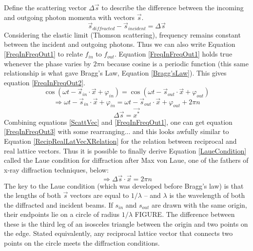 Define the scattering vector $\Delta\vec{s}$ to describe the difference between the incoming and outgoing photon momenta with vectors $\vec{s}$.
\begin{equation}
    \vec{s}_{diffracted}-\vec{s}_{incident}=\Delta\vec{s}
    \label{ScattVec}
\end{equation}
Considering the elastic limit (Thomson scattering), frequency remains constant between the incident and outgoing photons. Thus we can also write Equation \ref{FreqInFreqOut1} to relate $f_{in}$ to $f_{out}$. Equation \ref{FreqInFreqOut1} holds true whenever the phase varies by $2\pi n$ because cosine is a periodic function (this same relationship is what gave Bragg’s Law, Equation \ref{Bragg'sLaw}). This gives equation \ref{FreqInFreqOut2}. 
\begin{equation}
   \cos{(\omega t-\vec{s}_{in}\cdot\vec{x}+\varphi_{in})}=\cos{(\omega t-\vec{s}_{out}\cdot\vec{x}+\varphi_{out})}
    \label{FreqInFreqOut1}
\end{equation}
\begin{equation}
    \Rightarrow\omega t-\vec{s}_{in}\cdot\vec{x}+\varphi_{in}=\omega t-\vec{s}_{out}\cdot\vec{x}+\varphi_{out}+2\pi n
    \label{FreqInFreqOut2}
\end{equation}
\begin{equation}
    \Delta\vec{s}=\vec{x^*}
    \label{FreqInFreqOut3}
\end{equation}
Combining equations \ref{ScattVec} and \ref{FreqInFreqOut1}, one can get equation \ref{FreqInFreqOut3} with some rearranging... and this looks awfully similar to Equation \ref{RecipRealLatVecXRelation} for the relation between reciprocal and real lattice vectors. Thus it is possible to finally derive Equation \ref{LaueCondition} called the Laue condition for diffraction after Max von Laue, one of the fathers of x-ray diffraction techniques, below: 
\begin{equation}
    \Rightarrow\Delta\vec{s}\cdot\vec{x}=2\pi n
    \label{LaueCondition}
\end{equation}
The key to the Laue condition (which was developed before Bragg’s law)  is that the lengths of both $\vec{s}$ vectors are equal to $1/\lambda$ – and $\lambda$ is the wavelength of both the diffracted and incident beams. If $s_{in}$ and $s_{out}$ are drawn with the same origin, their endpoints lie on a circle of radius $1/\lambda$ FIGURE. The difference between these is the third leg of an isosceles triangle between the origin and two points on the edge. Stated equivalently, any reciprocal lattice vector that connects two points on the circle meets the diffraction conditions.

